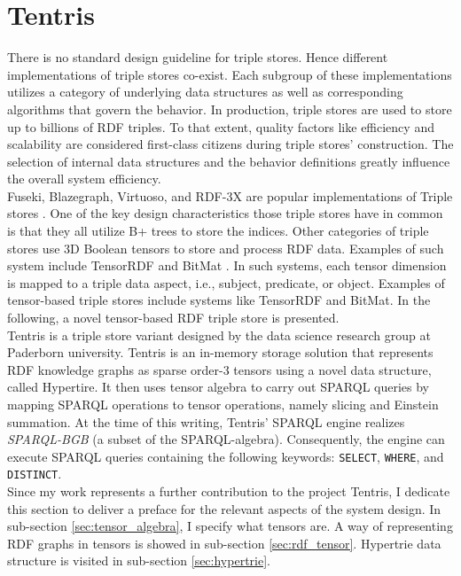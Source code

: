 \section{Tentris}
\label{sec:preliminaries:tentris}

There is no standard design guideline for triple stores. Hence different implementations of triple stores co-exist. Each subgroup of these implementations utilizes a category of underlying data structures as well as corresponding algorithms that govern the behavior. 
In production, triple stores are used to store up to billions of RDF triples. 
To that extent, quality factors like efficiency and scalability are considered first-class citizens during triple stores' construction. 
The selection of internal data structures and the behavior definitions greatly influence the overall system efficiency. \\

Fuseki, Blazegraph, Virtuoso, and RDF-3X are popular implementations of Triple stores \cite{fouc,SYS13,Erl,rdf3x}. 
One of the key design characteristics those triple stores have in common is that they all utilize B+ trees to store the indices. 
Other categories of triple stores use 3D Boolean tensors to store and process RDF data. Examples of such system include TensorRDF \cite{tensorrdf} and BitMat \cite{bitmat}. In such systems, each tensor dimension is mapped to a triple data aspect, i.e., subject, predicate, or object. Examples of tensor-based triple stores include systems like TensorRDF and BitMat. In the following, a novel tensor-based RDF triple store is presented. \\

Tentris is a triple store variant designed by the data science research group at Paderborn university\cite{tentris2020}. 
Tentris is an in-memory storage solution that represents RDF knowledge graphs as sparse order-3 tensors using a novel data structure, called Hypertire. 
It then uses tensor algebra to carry out SPARQL queries by mapping SPARQL operations to tensor operations, namely slicing and Einstein summation\cite{einstein}. 
At the time of this writing, Tentris' SPARQL engine realizes \textit{SPARQL-BGB}  (a subset of the SPARQL-algebra). 
Consequently, the engine can execute SPARQL queries containing the following keywords: \verb|SELECT|, \verb|WHERE|, and \verb|DISTINCT|\cite{Hitzler}. \\

Since my work represents a further contribution to the project Tentris, I dedicate this section to deliver a preface for the relevant aspects of the system design. In sub-section \ref{sec:tensor_algebra}, I specify what tensors are. A way of representing RDF graphs in tensors is showed in sub-section \ref{sec:rdf_tensor}. Hypertrie data structure is visited in sub-section \ref{sec:hypertrie}.

